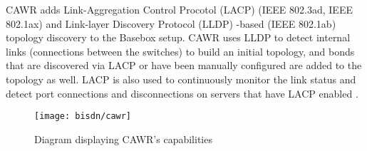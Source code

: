 \par CAWR adds Link-Aggregation Control Procotol (LACP) (IEEE 802.3ad, IEEE 802.1ax) and Link-layer Discovery Protocol (LLDP) -based (IEEE 802.1ab) topology 
discovery to the Basebox setup. CAWR uses LLDP to detect internal links (connections between the switches) to build an initial topology, and bonds that are
discovered via LACP or have been manually configured are added to the topology as well. LACP is also used to continuously monitor the link status and detect port
connections and disconnections on servers that have LACP enabled \cite{bisdn_gmbh_software_2017}.

\begin{figure} [!htbp]
    \centering
    \texttt{[image: bisdn/cawr]}
    \caption{Diagram displaying CAWR's capabilities\cite{bisdn_gmbh_software_2017}}
\end{figure}
